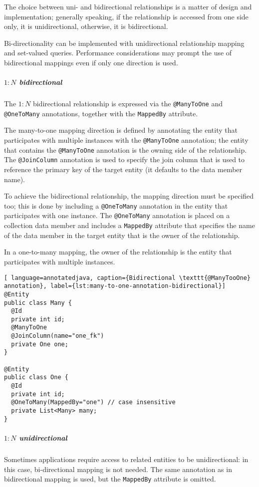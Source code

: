 \documentclass[english]{article}
\begin{document}
The choice between uni- and bidirectional relationships is a matter of design and implementation;
generally speaking, if the relationship is accessed from one side only, it is unidirectional, otherwise, it is bidirectional.

Bi-directionality can be implemented with unidirectional relationship mapping and set-valued queries.
Performance considerations may prompt the use of bidirectional mappings even if only one direction is used.

\subparagraph*{\(1:N\) bidirectional}

The \(1:N\) bidirectional relationship is expressed via the \texttt{@ManyToOne} and \texttt{@OneToMany} annotations, together with the \texttt{MappedBy} attribute.

The many-to-one mapping direction is defined by annotating the entity that participates with multiple instances with the \texttt{@ManyToOne} annotation;
the entity that contains the \texttt{@ManyToOne} annotation is the owning side of the relationship.
The \texttt{@JoinColumn} annotation is used to specify the join column that is used to reference the primary key of the target entity (it defaults to the data member name).

To achieve the bidirectional relationship, the mapping direction must be specified too;
this is done by including a \texttt{@OneToMany} annotation in the entity that participates with one instance.
The \texttt{@OneToMany} annotation is placed on a collection data member and includes a \texttt{MappedBy} attribute that specifies the name of the data member in the target entity that is the owner of the relationship.

In a one-to-many mapping, the owner of the relationship is the entity that participates with multiple instances.

\begin{lstlisting}[ language=annotatedjava, caption={Bidirectional \texttt{@ManyTooOne} annotation}, label={lst:many-to-one-annotation-bidirectional}]
@Entity
public class Many {
  @Id
  private int id;
  @ManyToOne
  @JoinColumn(name="one_fk")
  private One one;
}

@Entity
public class One {
  @Id
  private int id;
  @OneToMany(MappedBy="one") // case insensitive
  private List<Many> many;
}
\end{lstlisting}

\subparagraph*{\(1:N\) unidirectional}

Sometimes applications require access to related entities to be unidirectional: in this case, bi-directional mapping is not needed.
The same annotation as in bidirectional mapping is used, but the \texttt{MappedBy} attribute is omitted.
\end{document}
